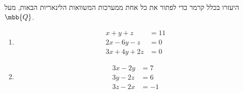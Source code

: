 \documentclass[a4paper,10pt,twoside,openany]{book}
\begin{document}
\begin{exercisechap}
היעזרו בכלל קרמר כדי לפתור את כל אחת ממערכות המשוואות הלינאריות הבאות, מעל
$\mbb{Q}$.

\begin{enumerate}
\item
\begin{align*}
x + y + z &= 11 \\
2x - 6y - z &= 0 \\
3x + 4y + 2z &= 0
\end{align*}
\item
\begin{align*}
3x - 2y &= 7 \\
3y - 2z &= 6 \\
3z - 2x &= -1
\end{align*}
\end{enumerate}
\end{exercisechap}
\end{document}
